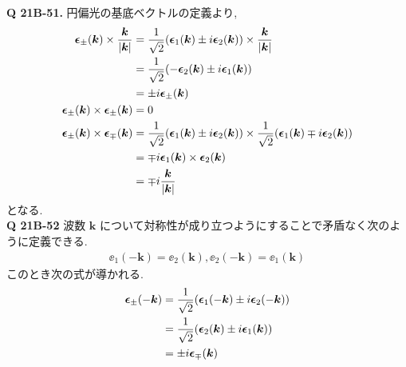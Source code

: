 \documentclass[uplatex,dvipdfmx,a4paper,11pt]{jlreq}
\newcommand{\kk}{\bm{k}}
\theoremstyle{definition}
\begin{document}
\textbf{Q 21B-51.}
円偏光の基底ベクトルの定義より,
\begin{align}
  \ee_\pm(\kk)\times\frac{\kk}{|\kk|}
   & = \frac{1}{\sqrt{2}}\qty(\ee_1(\kk) \pm \ii\ee_2(\kk))\times\frac{\kk}{|\kk|}                                    \\
   & = \frac{1}{\sqrt{2}}\qty(-\ee_2(\kk) \pm \ii\ee_1(\kk))                                                          \\
   & = \pm\ii\ee_\pm(\kk)                                                                                             \\
  \ee_\pm(\kk)\times\ee_\pm(\kk)
   & = 0                                                                                                              \\
  \ee_\pm(\kk)\times\ee_\mp(\kk)
   & = \frac{1}{\sqrt{2}}\qty(\ee_1(\kk) \pm \ii\ee_2(\kk))\times\frac{1}{\sqrt{2}}\qty(\ee_1(\kk) \mp \ii\ee_2(\kk)) \\
   & = \mp\ii\ee_1(\kk)\times\ee_2(\kk)                                                                               \\
   & = \mp\ii\frac{\kk}{|\kk|}
\end{align}
となる. \\

\textbf{Q 21B-52}
波数 $\kk$ について対称性が成り立つようにすることで矛盾なく次のように定義できる.
\begin{align}
  \ee_1(-\kk) = \ee_2(\kk), \ee_2(-\kk) = \ee_1(\kk)
\end{align}
このとき次の式が導かれる.
\begin{align}
  \ee_\pm(-\kk) & = \frac{1}{\sqrt{2}}\qty(\ee_1(-\kk)\pm\ii\ee_2(-\kk)) \\
                & = \frac{1}{\sqrt{2}}\qty(\ee_2(\kk)\pm\ii\ee_1(\kk))   \\
                & = \pm\ii\ee_\mp(\kk)
\end{align}
\end{document}
